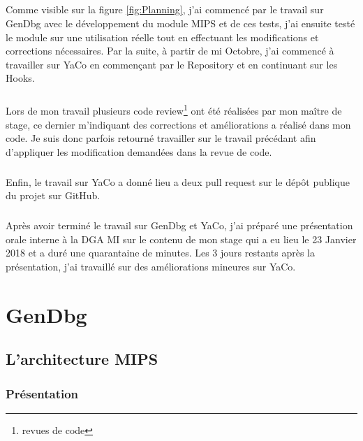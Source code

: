 \documentclass[11pt, book, english, french, standardlists]{upmethodology-document}
\begin{document}
				\paragraph*{}
					Comme visible sur la figure \ref{fig:Planning}, j'ai commencé par le travail sur GenDbg avec le développement du module \acrshort{MIPS} et de ces tests, j'ai ensuite testé le module sur une utilisation réelle tout en effectuant les modifications et corrections nécessaires. Par la suite, à partir de mi Octobre, j'ai commencé à travailler sur YaCo en commençant par le Repository et en continuant sur les Hooks.
				\paragraph*{}
					Lors de mon travail plusieurs code review\footnote{revues de code} ont été réalisées par mon maître de stage, ce dernier m'indiquant des corrections et améliorations a réalisé dans mon code. Je suis donc parfois retourné travailler sur le travail précédant afin d'appliquer les modification demandées dans la revue de code.
				\paragraph*{}
					Enfin, le travail sur YaCo a donné lieu a deux pull request\cite{GithubYaCoPR24,GithubYaCoPR30} sur le dépôt publique du projet sur GitHub\cite{GithubYaCo}.
				\paragraph*{}
					Après avoir terminé le travail sur GenDbg et YaCo, j'ai préparé une présentation orale interne à la \gls{DGA MI} sur le contenu de mon stage qui a eu lieu le 23 Janvier 2018 et a duré une quarantaine de minutes. Les 3 jours restants après la présentation, j'ai travaillé sur des améliorations mineures sur YaCo.
	\chapter{GenDbg}\label{ch:gendbg}
		\section{L'architecture MIPS}
			\subsection{Présentation}
\end{document}
